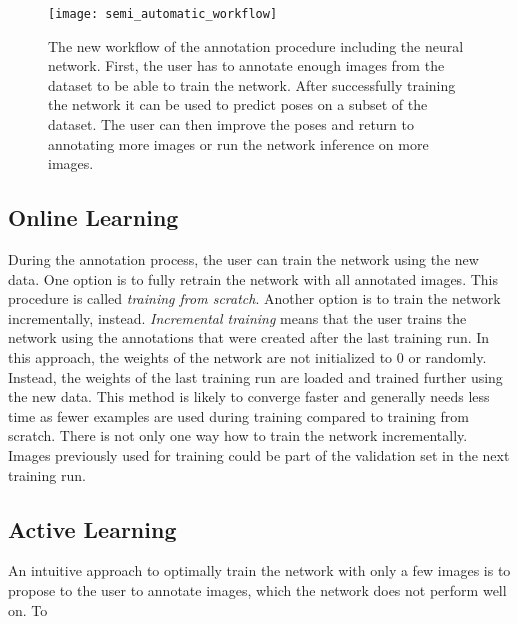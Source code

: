 \begin{figure}[!tbp]
	\centering
    \texttt{[image: semi\_automatic\_workflow]}
    \caption{The new workflow of the annotation procedure including the neural network. First, the user has to annotate enough images from the dataset to be able to train the network. After successfully training the network it can be used to predict poses on a subset of the dataset. The user can then improve the poses and return to annotating more images or run the network inference on more images.}
    	\label{fig:semi_automatic_workflow}
\end{figure}

\subsection{Online Learning} \label{subsection:online_learning}


During the annotation process, the user can train the network using the new data. One option is to fully retrain the network with all  annotated images. This procedure is called \textit{training from scratch}. Another option is to train the network incrementally, instead. \textit{Incremental training} means that the user trains the network using the annotations that were created after the last training run. In this approach, the weights of the network are not initialized to 0 or randomly. Instead, the weights of the last training run are loaded and trained further using the new data. This method is likely to converge faster and generally needs less time as fewer examples are used during training compared to training from scratch. There is not only one way how to train the network incrementally. Images previously used for training could be part of the validation set in the next training run. 

\subsection{Active Learning}

An intuitive approach to optimally train the network with only a few images is to propose to the user to annotate images, which the network does not perform well on. To 


